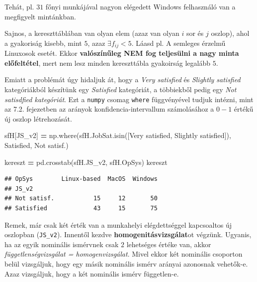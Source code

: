 \documentclass[
]{book}
\newenvironment{Shaded}{\begin{snugshade}}{\end{snugshade}}
\newcommand{\NormalTok}[1]{#1}
\newcommand{\OperatorTok}[1]{\textcolor[rgb]{0.81,0.36,0.00}{\textbf{#1}}}
\newcommand{\StringTok}[1]{\textcolor[rgb]{0.31,0.60,0.02}{#1}}
\begin{document}
Tehát, pl. \(31\) főnyi munkájával nagyon elégedett Windows felhasználó van a megfigyelt mintánkban.

Sajnos, a kereszttáblában van olyan elem (azaz van olyan \(i\) sor és \(j\) oszlop), ahol a gyakoriság kisebb, mint \(5\), azaz \(\exists f_{ij}<5\). Láasd pl. A semleges érzelmű Linuxosok esetét. Ekkor \textbf{valószínűleg NEM fog teljesülni a nagy minta előfeltétel}, mert nem lesz minden kereszttábla gyakoirság legalább \(5\).

Emiatt a problémát úgy hidaljuk át, hogy a \emph{Very satisfied} és \emph{Slightly satisfied} kategóriákból készítünk egy \emph{Satisfied} kategóriát, a többiekből pedig egy \emph{Not satisdfied kategóriát}. Ezt a \texttt{numpy} csomag \texttt{where} függvényével tudjuk intézni, mint az 7.2. fejezetben az arányok konfidencia-intervallum számolásához a \(0-1\) értékű új oszlop létrehozását.

\begin{Shaded}
\begin{Highlighting}[]
\NormalTok{sfH[}\StringTok{\textquotesingle{}JS\_v2\textquotesingle{}}\NormalTok{] }\OperatorTok{=}\NormalTok{ np.where(sfH.JobSat.isin([}\StringTok{\textquotesingle{}Very satisfied\textquotesingle{}}\NormalTok{,}
                                         \StringTok{\textquotesingle{}Slightly satisfied\textquotesingle{}}\NormalTok{]),}
                        \StringTok{\textquotesingle{}Satisfied\textquotesingle{}}\NormalTok{, }\StringTok{\textquotesingle{}Not satisf.\textquotesingle{}}\NormalTok{)}


\NormalTok{kereszt }\OperatorTok{=}\NormalTok{ pd.crosstab(sfH.JS\_v2, sfH.OpSys)}
\NormalTok{kereszt}
\end{Highlighting}
\end{Shaded}

\begin{verbatim}
## OpSys        Linux-based  MacOS  Windows
## JS_v2                                   
## Not satisf.           15     12       50
## Satisfied             43     15       75
\end{verbatim}

Remek, már csak két érték van a munkahelyi elégdettséggel kapcsoaltos új oszlopban (\texttt{JS\_v2}). Innentől kezdve \textbf{homogenitásvizsgálat}ot végzünk. Ugyanis, ha az egyik nominális ismérvnek csak \(2\) lehetséges értéke van, akkor \emph{függetlenségvizsgálat = homogenvizsgálat}. Mivel ekkor két nominális csoporton belül vizsgáljuk, hogy egy másik nominális ismérv arányai azonosnak vehetők-e. Azaz vizsgáljuk, hogy a két nominális ismérv független-e.
\end{document}
